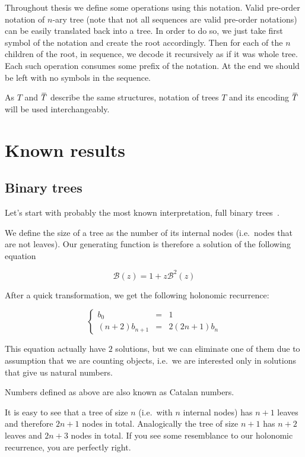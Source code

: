 \documentclass[final]{article}
\theoremstyle{definition}
\theoremstyle{definition}
\theoremstyle{remark}
\newcommand{\ols}[1]{\mskip.5\thinmuskip\overline{\mskip-.5\thinmuskip {#1} \mskip-.5\thinmuskip}\mskip.5\thinmuskip} %
\newcommand{\gf}[1]{\ensuremath{\mathcal{#1}}}
\newcommand{\enc}[1]{\ensuremath{\ols{#1}}}
\begin{document}
Throughout thesis we define some operations using this notation. Valid pre-order notation of \(n\)-ary tree (note that not all sequences are valid pre-order notations) can be easily translated back into a tree. In order to do so, we just take first symbol of the notation and create the root accordingly. Then for each of the \(n\) children of the root, in sequence, we decode it recursively as if it was whole tree. Each such operation consumes some prefix of the notation. At the end we should be left with no symbols in the sequence.

As \(T\) and \(\enc{T}\) describe the same structures, notation of trees \(T\) and its encoding \(\enc{T}\) will be used interchangeably.

\section{Known results}%
\label{sec:known_results}

\subsection{Binary trees}%
\label{sub:binary_trees}

Let's start with probably the most known interpretation, full binary trees~\cite{binary}.

We define the size of a tree as the number of its internal nodes (i.e.\ nodes that are not leaves). Our generating function is therefore a solution of the following equation

\[\gf{B}(z) = 1 + z\gf{B}^2(z)\]

After a quick transformation, we get the following holonomic recurrence:

\[\left\{\begin{array}{rcl}
            b_0 &=& 1\\
            (n + 2)b_{n + 1} &=& 2 (2n + 1)b_n
\end{array}\right.\]

This equation actually have \(2\) solutions, but we can eliminate one of them due to assumption that we are counting objects, i.e.\ we are interested only in solutions that give us natural numbers.

Numbers defined as above are also known as Catalan numbers.

It is easy to see that a tree of size \(n\) (i.e.\ with \(n\) internal nodes) has \(n + 1\) leaves and therefore \(2n + 1\) nodes in total. Analogically the tree of size \(n + 1\) has \(n + 2\) leaves and \(2n + 3\) nodes in total. If you see some resemblance to our holonomic recurrence, you are perfectly right.
\end{document}
